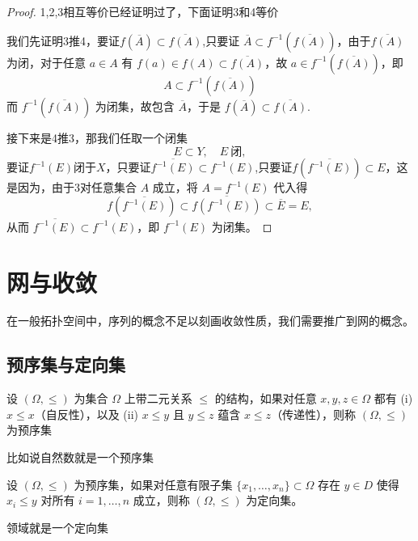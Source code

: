 \documentclass[lang=cn,a4paper,newtx,figureplace=section,tableplace=section]{elegantbook}
\begin{document}
\begin{proof}
    1,2,3相互等价已经证明过了，下面证明3和4等价

    我们先证明3推4，要证$f(\overline{A})\subset\overline{f(A)}$,只要证 $\overline{A}\subset f^{-1}(\overline{f(A)})$，由于$\overline{f(A)}$为闭，对于任意 $a\in A$ 有 $f(a)\in f(A)\subset\overline{f(A)}$，故 $a\in f^{-1}(\overline{f(A)})$，即
\begin{equation}
A\subset f^{-1}(\overline{f(A)})
\end{equation}
而 $f^{-1}(\overline{f(A)})$ 为闭集，故包含 $\overline{A}$，于是 $f(\overline{A})\subset\overline{f(A)}$.

接下来是4推3，那我们任取一个闭集
\begin{equation}
E\subset Y,\quad E\ \text{闭},
\end{equation}
要证$f^{-1}(E)$闭于$X$，只要证$\overline{f^{-1}(E)}\subset f^{-1}(E) $,只要证$f(\overline{f^{-1}(E)})\subset E$，这是因为，由于3对任意集合 $A$ 成立，将 $A=f^{-1}(E)$ 代入得
\begin{equation}
f(\overline{f^{-1}(E)})\subset\overline{f(f^{-1}(E))}\subset\overline{E}=E,
\end{equation}
从而 $\overline{f^{-1}(E)}\subset f^{-1}(E)$，即 $f^{-1}(E)$ 为闭集。
\end{proof}

\chapter{网与收敛}

在一般拓扑空间中，序列的概念不足以刻画收敛性质，我们需要推广到网的概念。

\section{预序集与定向集}

\begin{definition}[预序集]\label{def:preorder}设 $(\Omega,\leq)$ 为集合 $\Omega$ 上带二元关系 $\leq$ 的结构，如果对任意 $x,y,z\in \Omega$ 都有 (i) $x\leq x$（自反性），以及 (ii) $x\leq y$ 且 $y\leq z$ 蕴含 $x\leq z$（传递性），则称 $(\Omega,\leq)$ 为预序集\end{definition}

\begin{example}
    比如说自然数就是一个预序集
\end{example}

\begin{definition}[定向集]\label{def:directed}设 $(\Omega,\leq)$ 为预序集，如果对任意有限子集 $\{x_1,\dots,x_n\}\subset \Omega$ 存在 $y\in D$ 使得 $x_i\leq y$ 对所有 $i=1,\dots,n$ 成立，则称 $(\Omega,\leq)$ 为定向集。\end{definition}
\begin{example}
    领域就是一个定向集
\end{example}
\end{document}
